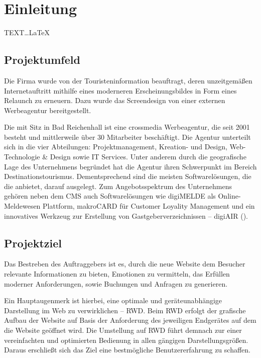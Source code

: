 \section{Einleitung}
\label{sec:Einleitung}
TEXT\ldots LaTeX

\subsection{Projektumfeld} 
\label{sec:Projektumfeld}
Die Firma \mh wurde von der Touristeninformation \kunde beauftragt, deren
unzeitgemäßen Internetauftritt mithilfe eines moderneren Erscheinungsbildes in
Form eines Relaunch zu erneuern. Dazu wurde das Screendesign von einer
externen Werbeagentur bereitgestellt.

Die \mh mit Sitz in Bad Reichenhall ist eine crossmedia Werbeagentur, 
die seit 2001 besteht und mittlerweile über 30 Mitarbeiter beschäftigt. 
Die Agentur unterteilt sich in die vier
Abteilungen: Projektmanagement, Kreation- und Design, Web-Technologie \& Design
sowie IT Services. Unter anderem durch die geografische Lage des Unternehmens 
begründet hat die Agentur ihren Schwerpunkt im Bereich Destinationstourismus.
Dementsprechend sind die meisten Softwarelösungen, die die \mh anbietet, darauf ausgelegt.
Zum Angebotsspektrum des Unternehmens gehören neben dem \ac{CMS} \ct 
auch Softwarelösungen wie digiMELDE als Online-Meldewesen Plattform, makroCARD
für Customer Loyality Management und ein innovatives Werkzeug zur
Erstellung von Gastgeberverzeichnissen -- digiAIR ().



\subsection{Projektziel} 
\label{sec:Projektziel}

Das Bestreben des Auftraggebers ist es, durch die neue Website dem Besucher
relevante Informationen zu bieten, Emotionen zu vermitteln, das Erfüllen
moderner Anforderungen, sowie Buchungen und Anfragen zu generieren.

Ein Hauptaugenmerk ist hierbei, eine optimale und geräteunabhängige Darstellung
im Web zu verwirklichen -- \ac{RWD}. Beim \ac{RWD} erfolgt der
grafische Aufbau der Website auf Basis der Anforderung des jeweiligen Endgerätes
auf dem die Website geöffnet wird. Die Umstellung auf \ac{RWD} führt demnach
zur einer vereinfachten und optimierten Bedienung in allen gängigen
Darstellungsgrößen. Daraus erschließt sich das Ziel eine bestmögliche
Benutzererfahrung zu schaffen.

